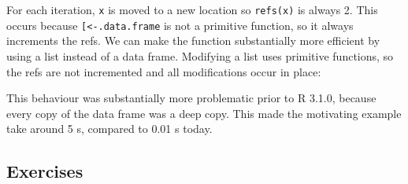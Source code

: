 \begin{Shaded}
\begin{Highlighting}[]
\NormalTok{:}\NormalTok{) \{}
  \StringTok{ }\StringTok{ }
  \NormalTok{(}\NormalTok{(}
\NormalTok{\}}
\end{Highlighting}
\end{Shaded}

For each iteration, \texttt{x} is moved to a new location so
\texttt{refs(x)} is always 2. This occurs because
\texttt{{[}\textless{}-.data.frame} is not a primitive function, so it
always increments the refs. We can make the function substantially more
efficient by using a list instead of a data frame. Modifying a list uses
primitive functions, so the refs are not incremented and all
modifications occur in place:

\begin{Shaded}
\begin{Highlighting}[]
\StringTok{ }

\NormalTok{:}\NormalTok{) \{}
  \StringTok{ }\StringTok{ }
  \NormalTok{(}\NormalTok{(}
\NormalTok{\}}
\end{Highlighting}
\end{Shaded}

This behaviour was substantially more problematic prior to R 3.1.0,
because every copy of the data frame was a deep copy. This made the
motivating example take around 5 s, compared to 0.01 s today.

\subsection{Exercises}

